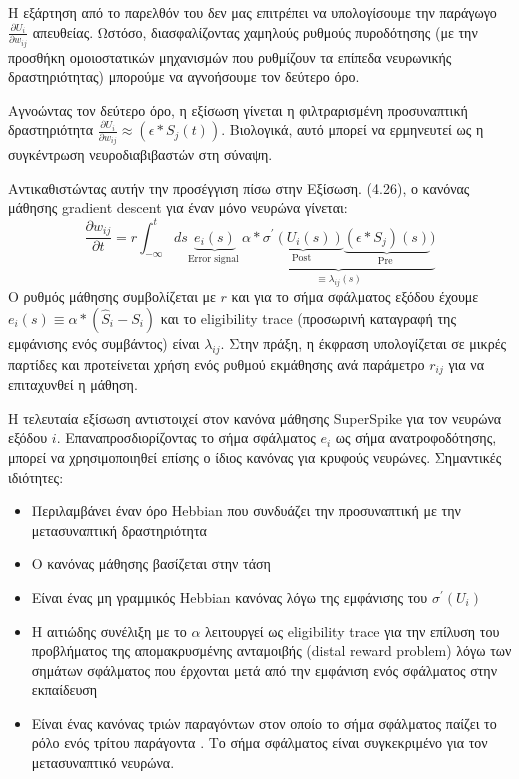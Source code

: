 \documentclass[12pt]{report}
\begin{document}
Η εξάρτηση από το παρελθόν του δεν μας επιτρέπει να υπολογίσουμε την παράγωγο $\frac{{\partial U}_{i}}{\partial w_{i j}}$ απευθείας. Ωστόσο, διασφαλίζοντας χαμηλούς ρυθμούς πυροδότησης (με την προσθήκη ομοιοστατικών μηχανισμών που ρυθμίζουν τα επίπεδα νευρωνικής δραστηριότητας) μπορούμε να αγνοήσουμε τον δεύτερο όρο.

Αγνοώντας τον δεύτερο όρο, η εξίσωση γίνεται η φιλτραρισμένη προσυναπτική δραστηριότητα $\frac{\partial U_{i}}{\partial w_{i j}} \approx\left(\epsilon * S_{j}(t)\right)$. Βιολογικά, αυτό μπορεί να ερμηνευτεί ως η συγκέντρωση νευροδιαβιβαστών στη σύναψη.

Αντικαθιστώντας αυτήν την προσέγγιση πίσω στην Εξίσωση. (4.26), ο κανόνας μάθησης \textlatin{gradient descent} για έναν μόνο νευρώνα γίνεται:
\begin{equation}
\label{eqn:superspike}
\frac{\partial w_{i j}}{\partial t}=r \int_{-\infty}^{t} d s \underbrace{e_{i}(s)}_{\text {Error signal }} \underbrace{\alpha * \underbrace{\sigma^{\prime}\left(U_{i}(s)\right)}_{\text {Post }} \underbrace{\left(\epsilon * S_{j}\right)(s)}_{\text {Pre }})}_{\equiv \lambda_{i j}(s)}
\end{equation}
Ο ρυθμός μάθησης συμβολίζεται με $r$ και για το σήμα σφάλματος εξόδου έχουμε $e_{i}(s) \equiv \alpha *\left(\hat{S}_{i}-S_{i}\right)$ και το \textlatin{eligibility trace} (προσωρινή
καταγραφή της εμφάνισης ενός συμβάντος) είναι $\lambda_{i j} .$ Στην πράξη, η έκφραση υπολογίζεται σε μικρές παρτίδες και προτείνεται χρήση ενός ρυθμού εκμάθησης ανά παράμετρο $r_{i j}$ για να επιταχυνθεί η μάθηση.

Η τελευταία εξίσωση αντιστοιχεί στον κανόνα μάθησης \textlatin{SuperSpike} για τον νευρώνα εξόδου $i$.
Επαναπροσδιορίζοντας το σήμα σφάλματος $e_{i}$ ως σήμα ανατροφοδότησης, μπορεί να χρησιμοποιηθεί επίσης ο ίδιος κανόνας για κρυφούς νευρώνες. Σημαντικές ιδιότητες:
\begin{itemize}
  \item Περιλαμβάνει έναν όρο \textlatin{Hebbian}  που συνδυάζει την προσυναπτική με την μετασυναπτική δραστηριότητα
  \item Ο κανόνας μάθησης βασίζεται στην τάση
  \item Είναι ένας μη γραμμικός \textlatin{Hebbian} κανόνας λόγω της εμφάνισης του $\sigma^{\prime}\left(U_{i}\right)$
  \item Η αιτιώδης συνέλιξη με το $\alpha$ λειτουργεί ως \textlatin{eligibility trace} για την επίλυση του προβλήματος της απομακρυσμένης ανταμοιβής (\textlatin{distal reward problem}) λόγω των σημάτων σφάλματος που έρχονται μετά από την εμφάνιση ενός σφάλματος στην εκπαίδευση \cite{izike2007}
  \item Είναι ένας κανόνας τριών παραγόντων στον οποίο το σήμα σφάλματος παίζει το ρόλο ενός τρίτου παράγοντα \cite{fremaux2016} . Το σήμα σφάλματος είναι συγκεκριμένο για τον μετασυναπτικό νευρώνα.
\end{itemize}
\end{document}
